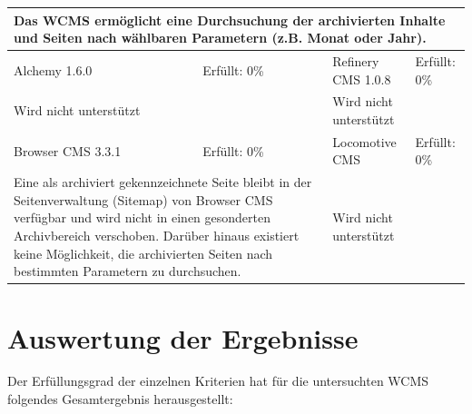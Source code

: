 \begin{tabular}[!ht]{|l|l|l|l|}
\hline
\multicolumn{4}{|p{15cm}|}{\textbf{Das WCMS ermöglicht eine Durchsuchung der archivierten Inhalte und Seiten nach wählbaren Parametern (z.B. Monat oder Jahr).}} \\
\hline
  Alchemy 1.6.0 & \cellcolor{red}Erfüllt: 0\% & Refinery CMS 1.0.8 & \cellcolor{red}Erfüllt: 0\% \\
  \hline
  \multicolumn{2}{|p{7.5cm}|}{Wird nicht unterstützt} & \multicolumn{2}{p{7.5cm}|}{Wird nicht unterstützt} \\
  \hline
  Browser CMS 3.3.1 & \cellcolor{red}Erfüllt: 0\% & Locomotive CMS & \cellcolor{red}Erfüllt: 0\% \\
  \hline
  \multicolumn{2}{|p{7.5cm}|}{Eine als archiviert gekennzeichnete Seite bleibt in der Seitenverwaltung (Sitemap) von Browser CMS verfügbar und wird nicht in einen gesonderten Archivbereich verschoben. Darüber hinaus existiert keine Möglichkeit, die archivierten Seiten nach bestimmten Parametern zu durchsuchen.} & \multicolumn{2}{p{7.5cm}|}{Wird nicht unterstützt} \\
\hline
\end{tabular}




\newpage
\section{Auswertung der Ergebnisse}

Der Erfüllungsgrad der einzelnen Kriterien hat für die untersuchten WCMS folgendes Gesamtergebnis herausgestellt:

